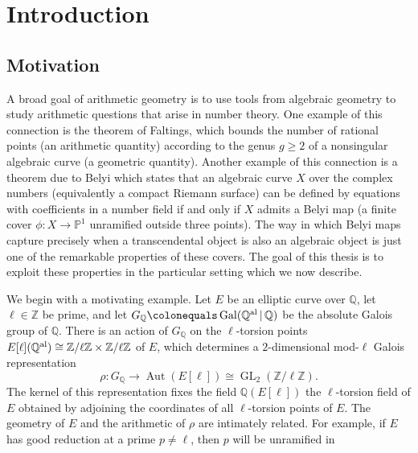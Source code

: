 \documentclass{dcthesis}
\newcommand{\PP}{\mathbb P}
\newcommand{\QQ}{\mathbb Q}
\newcommand{\ZZ}{\mathbb Z}
\newcommand{\defi}[1]{\textsf{#1}}
\newcommand{\QQal}{{\mathbb Q}^{\textup{al}}}
\DeclareMathOperator{\Aut}{Aut}
\DeclareMathOperator{\Gal}{Gal}
\DeclareMathOperator{\GL}{GL}
\numberwithin{equation}{section}
\theoremstyle{definition}
\theoremstyle{remark}
\begin{document}
\chapter{Introduction}{\label{chapter:intro}
  \section{Motivation}{\label{sec:motivation}{
    A broad goal of arithmetic geometry is
    to use tools from algebraic geometry
    to study arithmetic questions that arise
    in number theory.
    One example of this connection is
    the theorem of
    Faltings,
    which bounds
    the number of rational points
    (an arithmetic quantity)
    according to
    the genus $g \geq 2$
    of a nonsingular algebraic curve
    (a geometric quantity).
    Another example of this connection
    is a theorem due to Belyi
    which states that an algebraic curve
    $X$
    over the complex numbers
    (equivalently a compact Riemann surface)
    can be defined by equations with
    coefficients in a number field
    if and only if
    $X$ admits a \defi{Belyi map}
    (a finite cover $\phi\colon X\to\PP^1$
    unramified outside three points).
    The way in which Belyi maps
    capture precisely when a transcendental
    object is also an algebraic object
    is just one of the remarkable properties
    of these covers.
    The goal of this thesis is to exploit
    these properties in the
    particular setting which we
    now describe.
    \par
    We begin with a motivating example.
    Let $E$ be an elliptic curve over $\QQ$,
    let $\ell\in\ZZ$ be prime,
    and let $G_\QQ\colonequals\Gal(\QQal\,|\,\QQ)$
    be the absolute Galois group of $\QQ$.
    There is an action of $G_\QQ$ on the
    $\ell$-torsion points
    $E[\ell](\QQal)\cong\ZZ/\ell\ZZ\times
    \ZZ/\ell\ZZ$
    of $E$,
    which determines a $2$-dimensional
    mod-$\ell$ Galois representation
    \begin{equation}
      \label{eqn:modlgalois}
      \rho\colon
      G_\QQ\to
      \Aut(E[\ell])\cong
      \GL_2(\ZZ/\ell\ZZ).
    \end{equation}
    The kernel of this
    representation fixes the field
    $\QQ(E[\ell])$
    the
    $\ell$-torsion field of $E$
    obtained by adjoining the coordinates
    of all $\ell$-torsion points of $E$.
    The geometry of $E$ and the arithmetic
    of $\rho$ are intimately related.
    For example,
    if $E$ has good reduction at a prime $p\neq\ell$,
    then $p$ will be unramified in
}}}
\end{document}
